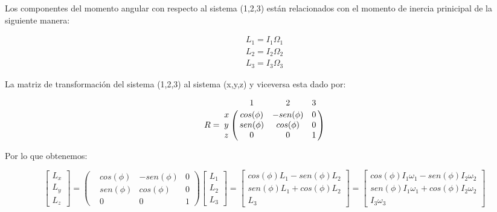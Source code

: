 	Los componentes del momento angular con respecto al sistema (1,2,3) están relacionados con el momento de inercia prinicipal de la siguiente manera:

		\begin{subequations}
    	\begin{align}
    	L_{1} = I_{1}\Omega_{1}\\
    	L_{2} = I_{2}\Omega_{2}\\
    	L_{3} = I_{3}\Omega_{3}
		\end{align}
		\label{ec20}
		\end{subequations} %

	La matriz de transformación del sistema (1,2,3) al sistema (x,y,z) y viceversa esta dado por:

		\begin{equation}
    	R = \bordermatrix{~ & 1 & 2 & 3 \cr
        x & cos(\phi) & -sen(\phi) & 0 \cr
        y & sen(\phi) &  cos(\phi) & 0 \cr
        z & 0       &  0       & 1 \cr }
    	\label{ec21}
    	\end{equation}

    Por lo que obtenemos:

		\begin{equation}
		\begin{bmatrix}
  		{L_{x}}\\
  		{L_{y}}\\
  		{L_{z}}
  		\end{bmatrix} =
 		\begin{pmatrix}
        & cos(\phi) & -sen(\phi) & 0 \\
        & sen(\phi) &  cos(\phi) & 0 \\
        & 0       &  0       & 1
		\end{pmatrix}
    	\begin{bmatrix}
  		L_{1}\\
  		L_{2}\\
  		L_{3}
  		\end{bmatrix}
  		=
    	\begin{bmatrix}
  		cos(\phi) L_{1} - sen(\phi) L_{2} \\
  		sen(\phi) L_{1} + cos(\phi) L_{2} \\
  		L_{3}
  		\end{bmatrix}
  		=
    	\begin{bmatrix}
  		cos(\phi) I_{1} \omega_{1} - sen(\phi) I_{2} \omega_{2} \\
  		sen(\phi) I_{1} \omega_{1} + cos(\phi) I_{2} \omega_{2} \\
  		I_{3} \omega_{3}
  		\end{bmatrix}
		\label{ec22}
		\end{equation} %

